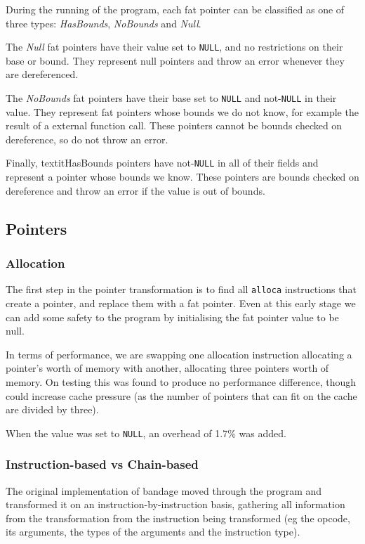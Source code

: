 During the running of the program, each fat pointer can be classified as one of three types: \textit{HasBounds}, \textit{NoBounds} and \textit{Null}.

The \textit{Null} fat pointers have their value set to \verb!NULL!, and no restrictions on their base or bound.
They represent null pointers and throw an error whenever they are dereferenced.

The \textit{NoBounds} fat pointers have their base set to \verb!NULL! and not-\verb!NULL! in their value.
They represent fat pointers whose bounds we do not know, for example the result of a external function call.
These pointers cannot be bounds checked on dereference, so do not throw an error.

Finally, textit{HasBounds} pointers have not-\verb!NULL! in all of their fields and represent a pointer whose bounds we know.
These pointers are bounds checked on dereference and throw an error if the value is out of bounds.

\subsection{Pointers}

\subsubsection{Allocation}

The first step in the pointer transformation is to find all \verb!alloca! instructions that create a pointer, and replace them with a fat pointer.
Even at this early stage we can add some safety to the program by initialising the fat pointer value to be null.

In terms of performance, we are swapping one allocation instruction allocating a pointer's worth of memory with another, allocating three pointers worth of memory. 
On testing this was found to produce no performance difference, though could increase cache pressure (as the number of pointers that can fit on the cache are divided by three).

When the value was set to \verb!NULL!, an overhead of 1.7\% was added.

\subsubsection{Instruction-based vs Chain-based}

The original implementation of bandage moved through the program and transformed it on an instruction-by-instruction basis, gathering all information from the transformation from the instruction being transformed (eg the opcode, its arguments, the types of the arguments and the instruction type).

